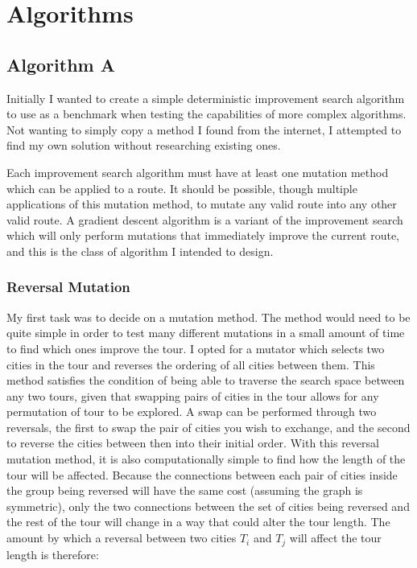 \documentclass[a4paper,11pt]{article}
\begin{document}
\section{Algorithms}
\subsection{Algorithm A}
Initially I wanted to create a simple deterministic improvement search
algorithm to use as a benchmark when testing the capabilities of more complex
algorithms. Not wanting to simply copy a method I found from the internet, I
attempted to find my own solution without researching existing ones.

Each improvement search algorithm must have at least one mutation method which
can be applied to a route. It should be possible, though multiple applications
of this mutation method, to mutate any valid route into any other valid route.
A gradient descent algorithm is a variant of the improvement search which will
only perform mutations that immediately improve the current route, and this is
the class of algorithm I intended to design.

\subsubsection{Reversal Mutation}
My first task was to decide on a mutation method. The method would need to be
quite simple in order to test many different mutations in a small amount of
time to find which ones improve the tour. I opted for a mutator which selects
two cities in the tour and reverses the ordering of all cities between them.
This method satisfies the condition of being able to traverse the search space
between any two tours, given that swapping pairs of cities in the tour allows
for any permutation of tour to be explored. A swap can be performed through two
reversals, the first to swap the pair of cities you wish to exchange, and the
second to reverse the cities between then into their initial order. With this
reversal mutation method, it is also computationally simple to find how the
length of the tour will be affected. Because the connections between each pair
of cities inside the group being reversed will have the same cost (assuming the
graph is symmetric), only the two connections between the set of cities being
reversed and the rest of the tour will change in a way that could alter the
tour length. The amount by which a reversal between two cities $T_i$ and $T_j$
will affect the tour length is therefore:
\end{document}
